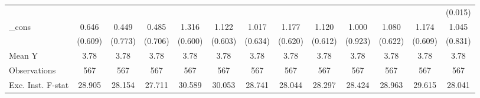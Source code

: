 {\begin{tabular}{l*{12}{c}}
            &                     &                     &                     &                     &                     &                     &                     &                     &                     &                     &                     &     (0.015)         \\
\addlinespace
\_cons      &       0.646         &       0.449         &       0.485         &       1.316\sym{**} &       1.122\sym{*}  &       1.017         &       1.177\sym{*}  &       1.120\sym{*}  &       1.000         &       1.080\sym{*}  &       1.174\sym{*}  &       1.045         \\
            &     (0.609)         &     (0.773)         &     (0.706)         &     (0.600)         &     (0.603)         &     (0.634)         &     (0.620)         &     (0.612)         &     (0.923)         &     (0.622)         &     (0.609)         &     (0.831)         \\
\midrule
Mean Y      &        3.78         &        3.78         &        3.78         &        3.78         &        3.78         &        3.78         &        3.78         &        3.78         &        3.78         &        3.78         &        3.78         &        3.78         \\
Observations&         567         &         567         &         567         &         567         &         567         &         567         &         567         &         567         &         567         &         567         &         567         &         567         \\
Exc. Inst. F-stat&      28.905         &      28.154         &      27.711         &      30.589         &      30.053         &      28.741         &      28.044         &      28.297         &      28.424         &      28.963         &      29.615         &      28.041         \\
\bottomrule
\end{tabular}
}
